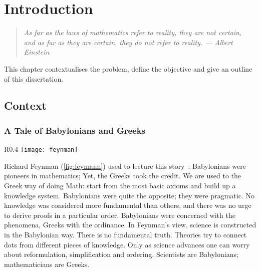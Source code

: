 \chapter{Introduction}\label{ch:introduction}

\begin{quote}
	\small \textit{ \flushright As far as the laws of mathematics refer to reality, they are not certain, \\and as far as they are certain, they do not refer to reality. \flushright --- Albert Einstein\\
		\vspace{1cm} }
\end{quote}
This chapter contextualises the problem, define the objective and give an outline of this dissertation.


\section{Context}

\subsection{A Tale of Babylonians and Greeks}



\begin{wrapfigure}{R}{0.4\textwidth}
	\centering
	\texttt{[image: feynman]}
	\caption{Richard Feynman, Nobel laureate physicist. \protect\footnotemark}\label{fig:feymann}
\end{wrapfigure}

\protect{}
Richard Feynman (\cref{fig:feymann}) used to lecture this story~\cite{feynman:1994}: Babylonians were pioneers in mathematics; Yet, the Greeks took the credit. We are used to the Greek way of doing Math: start from the most basic axioms and build up a knowledge system. Babylonians were quite the opposite; they were pragmatic. No knowledge was considered more fundamental than others, and there was no urge to derive proofs in a particular order. Babylonians were concerned with the phenomena, Greeks with the ordinance. In Feynman's view, science is constructed in the Babylonian way. There is no fundamental truth. Theories try to connect dots from different pieces of knowledge. Only as science advances one can worry about reformulation, simplification and ordering. Scientists are Babylonians; mathematicians are Greeks.


